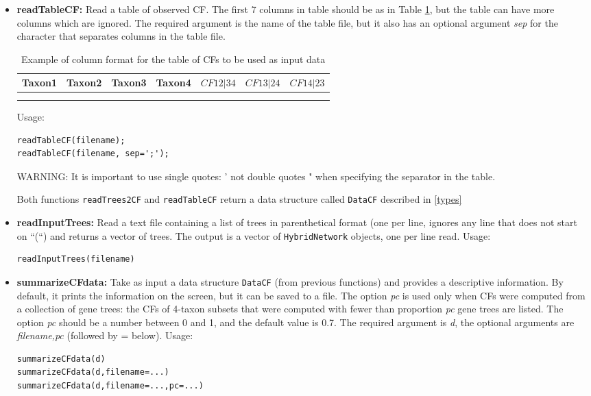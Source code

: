\documentclass[12pt]{article}
\begin{document}
\begin{itemize}
\item \textbf{readTableCF:} Read a table of observed CF. The first 7
  columns in table should be as in Table \ref{tableCF}, but the table
  can have more columns which are ignored. The required
  argument is the name of the table file, but it also has an optional
  argument \textit{sep} for the character that
  separates columns in the table file.\\
\begin{table}[h]
\centering
\begin{tabular}{c|c|c|c|c|c|c}
Taxon1 & Taxon2 &Taxon3 & Taxon4 & $CF12|34$ & $CF13|24$ &  $CF14|23$\\
\hline \\
 & & & & & &
\end{tabular}
\caption{Example of column format for the table of CFs to be used as
  input data}
\label{tableCF}
\end{table}

Usage:
\begin{lstlisting}
readTableCF(filename);
readTableCF(filename, sep=';');
\end{lstlisting}
WARNING: It is important to use single quotes: ' not double quotes "
when specifying the separator in the table.

Both functions \texttt{readTrees2CF} and \texttt{readTableCF} return a
data structure called \texttt{DataCF} described in \ref{types}

\item \textbf{readInputTrees:} Read a text file containing a list of trees
  in parenthetical format (one per line, ignores any line that does
  not start on ``(``) and
  returns a vector of trees. The output is a vector of
  \texttt{HybridNetwork} objects, one per line read.
  Usage:
\begin{lstlisting}
readInputTrees(filename)
\end{lstlisting}

\item \textbf{summarizeCFdata:} Take as input a data structure
  \texttt{DataCF} (from previous functions) and provides a descriptive
  information. By default, it prints the information on the screen,
  but it can be saved to a file. The option \textit{pc} is used only
  when CFs were computed from a collection of gene trees: the CFs of
  4-taxon subsets that were computed with fewer than proportion
  \textit{pc} gene trees are listed. The option \textit{pc} should be
  a number between 0 and 1, and the default value is 0.7. The required
  argument is \textit{d}, the optional
  arguments are \textit{filename,pc} (followed by = below).
  Usage:
\begin{lstlisting}
summarizeCFdata(d)
summarizeCFdata(d,filename=...)
summarizeCFdata(d,filename=...,pc=...)
\end{lstlisting}


\end{itemize}
\end{document}
